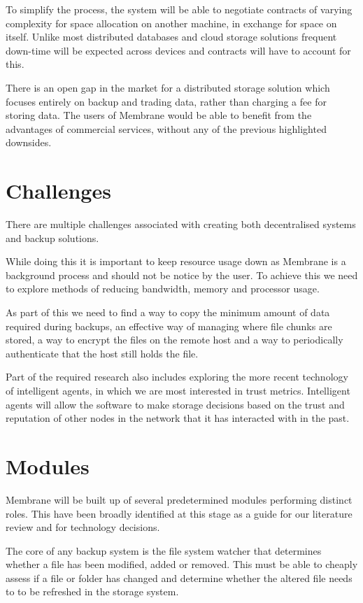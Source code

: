 \documentclass[11pt, a4paper, twocolumn, twoside]{report}
\begin{document}
To simplify the process, the system will be able to negotiate contracts of varying complexity for space allocation on another machine, in exchange for space on itself. Unlike most distributed databases and cloud storage solutions frequent down-time will be expected across devices and contracts will have to account for this.

There is an open gap in the market for a distributed storage solution which focuses entirely on backup and trading data, rather than charging a fee for storing data. The users of Membrane would be able to benefit from the advantages of commercial services, without any of the previous highlighted downsides.

\section{Challenges}
There are multiple challenges associated with creating both decentralised systems and backup solutions.

While doing this it is important to keep resource usage down as Membrane is a background process and should not be notice by the user. To achieve this we need to explore methods of reducing bandwidth, memory and processor usage.

As part of this we need to find a way to copy the minimum amount of data required during backups, an effective way of managing where file chunks are stored, a way to encrypt the files on the remote host and a way to periodically authenticate that the host still holds the file.

Part of the required research also includes exploring the more recent technology of intelligent agents, in which we are most interested in trust metrics. Intelligent agents will allow the software to make storage decisions based on the trust and reputation of other nodes in the network that it has interacted with in the past.

\section{Modules}

Membrane will be built up of several predetermined modules performing distinct roles. This have been broadly identified at this stage as a guide for our literature review and for technology decisions.

The core of any backup system is the file system watcher that determines whether a file has been modified, added or removed. This must be able to cheaply assess if a file or folder has changed and determine whether the altered file needs to to be refreshed in the storage system.
\end{document}
